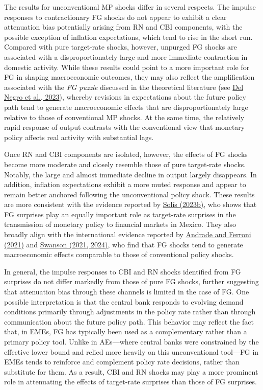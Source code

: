 \documentclass[12pt, reqno]{article}
\begin{document}
The results for unconventional MP shocks differ in several respects. The impulse responses to contractionary FG shocks do not appear to exhibit a clear attenuation bias potentially arising from RN and CBI components, with the possible exception of inflation expectations, which tend to rise in the short run. Compared with pure target-rate shocks, however, unpurged FG shocks are associated with a disproportionately large and more immediate contraction in domestic activity. While these results could point to a more important role for FG in shaping macroeconomic outcomes, they may also reflect the amplification associated with the \emph{FG puzzle} discussed in the theoretical literature (see \hyperlink{Del Negro et al. (2023)}{Del Negro et al., 2023}), whereby revisions in expectations about the future policy path tend to generate macroeconomic effects that are disproportionately large relative to those of conventional MP shocks. At the same time, the relatively rapid response of output contrasts with the conventional view that monetary policy affects real activity with substantial lags.


Once RN and CBI components are isolated, however, the effects of FG shocks become more moderate and closely resemble those of pure target-rate shocks. Notably, the large and almost immediate decline in output largely disappears. In addition, inflation expectations exhibit a more muted response and appear to remain better anchored following the unconventional policy shock. These results are more consistent with the evidence reported by \hyperlink{Solis (2023b)}{Solís (2023b)}, who shows that FG surprises play an equally important role as target-rate surprises in the transmission of monetary policy to financial markets in Mexico. They also broadly align with the international evidence reported by \hyperlink{Andrade and Ferroni (2021)}{Andrade and Ferroni (2021)} and \hyperlink{Swanson (2021, 2024)}{Swanson (2021, 2024)}, who find that FG shocks tend to generate macroeconomic effects comparable to those of conventional policy shocks.

In general, the impulse responses to CBI and RN shocks identified from FG surprises do not differ markedly from those of pure FG shocks, further suggesting that attenuation bias through these channels  is limited in the case of FG. One possible interpretation is that the central bank responds to evolving demand conditions primarily through adjustments in the policy rate rather than through communication about the future policy path. This behavior may reflect the fact that, in EMEs, FG has typically been used as a complementary rather than a primary policy tool. Unlike in AEs—where central banks were constrained by the effective lower bound and relied more heavily on this unconventional tool—FG in EMEs tends to reinforce and complement policy rate decisions, rather than substitute for them. As a result, CBI and RN shocks may play a more prominent role in attenuating the effects of target-rate surprises than those of FG surprises.
\end{document}
